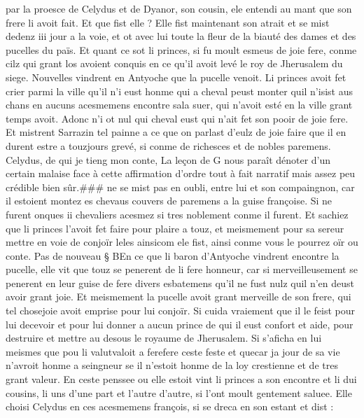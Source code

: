 \documentclass{article}
\begin{document}
\begin{pages}
   par la proesce de Celydus et de Dyanor, 
   son cousin, ele entendi 
   au mant que son frere li avoit fait. Et que fist elle ? 
   Elle fist maintenant son atrait et se mist dedenz iii jour a la voie, et ot avec lui toute la fleur de la biauté des dames 
   et des pucelles du païs. Et quant ce sot li princes, si fu moult esmeus de joie fere, 
   conme cilz qui grant los avoient conquis en ce qu’il avoit levé le 
   roy de Jherusalem du siege. \pend
\pstart Nouvelles vindrent en Antyoche que 
   la pucelle venoit. Li princes avoit fet crier parmi 
   la ville qu’il n’i eust honme qui a cheval peust monter quil n’isist aus chans en aucuns 
   acesmemens encontre sala suer, 
   qui n’avoit esté en la ville grant temps avoit. Adonc n’i ot nul qui cheval eust qui n’ait fet 
   son pooir de joie fere. Et mistrent Sarrazin tel painne a ce que on parlast d’eulz de joie faire 
   que il en durent estre a touzjours grevé, si conme de richesces et de nobles paremens. Celydus, 
   de qui je tieng mon conte,
   La leçon de G nous paraît dénoter d'un certain malaise face à cette affirmation d'ordre tout à fait narratif 
      mais assez peu crédible bien sûr.###
   ne se mist pas en oubli, 
   entre lui et son compaingnon, car il estoient 
   montez es chevaus couvers de paremens a la guise françoise.
   Si ne furent onques ii chevaliers acesmez si tres noblement conme il furent. Et sachiez que 
   li princes l’avoit fet faire pour plaire a touz, et meismement pour 
   sa sereur mettre en voie de conjoïr 
   leles 
   ainsicom ele fist, ainsi conme vous 
      le pourrez oïr ou conte. \pend
\pstart Pas de nouveau § BEn ce que li baron 
   d’Antyoche vindrent encontre 
   la pucelle, elle vit que touz se penerent de li fere honneur, car si merveilleusement se penerent 
   en leur guise de fere divers esbatemens qu’il ne fust nulz quil n’en deust avoir grant joie. Et meismement 
   la pucelle avoit grant merveille de son frere, 
   qui tel chosejoie avoit emprise pour lui conjoïr. 
   Si cuida vraiement que il le feist pour lui decevoir et pour lui donner 
   a aucun prince de qui il eust confort et aide, pour destruire et mettre au 
   desous le royaume de Jherusalem. Si s’aficha en lui meismes que pou li 
   valutvaloit a ferefere ceste 
   feste et quecar ja jour de sa vie n’avroit honme a seingneur se il n’estoit 
   honme de la loy crestienne et de tres grant valeur. En ceste penssee ou elle estoit vint 
   li princes a son encontre et li dui cousins, li uns d’une part et l’autre d’autre, 
   si l’ont moult gentement saluee. 
   Elle choisi Celydus en ces acesmemens françois, si se dreca en son estant et dist :

\end{pages}
\end{document}
